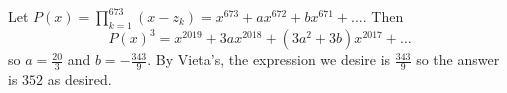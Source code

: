 Let $P\left(x\right)=\displaystyle\prod_{k=1}^{673}\left(x-z_k\right)=x^{673}+ax^{672}+bx^{671}+\ldots$. Then \[P\left(x\right)^3=x^{2019}+3ax^{2018}+\left(3a^2+3b\right)x^{2017}+\ldots\] so $a=\frac{20}{3}$ and $b=-\frac{343}{9}$. By Vieta's, the expression we desire is $\frac{343}{9}$ so the answer is $\boxed{352}$ as desired.